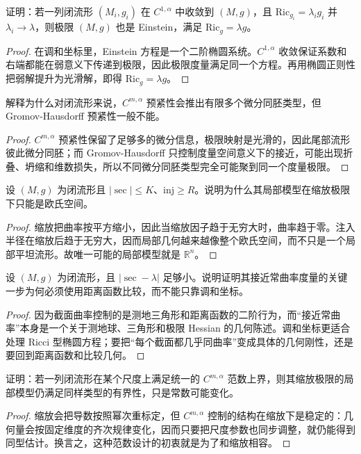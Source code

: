 \documentclass[11pt,a4paper,openany]{ctexbook}
\numberwithin{equation}{chapter}
\begin{document}
\begin{exercise}
证明：若一列闭流形 \((M_i,g_i)\) 在 \(C^{1,\alpha}\) 中收敛到 \((M,g)\)，且 \(\mathrm{Ric}_{g_i}=\lambda_i g_i\) 并 \(\lambda_i\to \lambda\)，则极限 \((M,g)\) 也是 Einstein，满足 \(\mathrm{Ric}_g=\lambda g\)。
\end{exercise}
\begin{proof}
在调和坐标里，Einstein 方程是一个二阶椭圆系统。\(C^{1,\alpha}\) 收敛保证系数和右端都能在弱意义下传递到极限，因此极限度量满足同一个方程。再用椭圆正则性把弱解提升为光滑解，即得 \(\mathrm{Ric}_g=\lambda g\)。  
\end{proof}

\begin{exercise}
解释为什么对闭流形来说，\(C^{m,\alpha}\) 预紧性会推出有限多个微分同胚类型，但 Gromov-Hausdorff 预紧性一般不能。
\end{exercise}
\begin{proof}
\(C^{m,\alpha}\) 预紧性保留了足够多的微分信息，极限映射是光滑的，因此尾部流形彼此微分同胚；而 Gromov-Hausdorff 只控制度量空间意义下的接近，可能出现折叠、坍缩和维数损失，所以不同微分同胚类型完全可能聚到同一个度量极限。  
\end{proof}

\begin{exercise}
设 \((M,g)\) 为闭流形且 \(|\sec|\le K\)、\(\mathrm{inj}\ge R\)。说明为什么其局部模型在缩放极限下只能是欧氏空间。
\end{exercise}
\begin{proof}
缩放把曲率按平方缩小，因此当缩放因子趋于无穷大时，曲率趋于零。注入半径在缩放后趋于无穷大，因而局部几何越来越像整个欧氏空间，而不只是一个局部平坦流形。故唯一可能的局部模型就是 \(\mathbb R^n\)。  
\end{proof}

\begin{exercise}
设 \((M,g)\) 为闭流形，且 \(|\sec-\lambda|\) 足够小。说明证明其接近常曲率度量的关键一步为何必须使用距离函数比较，而不能只靠调和坐标。
\end{exercise}
\begin{proof}
因为截面曲率控制的是测地三角形和距离函数的二阶行为，而“接近常曲率”本身是一个关于测地球、三角形和极限 Hessian 的几何陈述。调和坐标更适合处理 Ricci 型椭圆方程；要把“每个截面都几乎同曲率”变成具体的几何刚性，还是要回到距离函数和比较几何。  
\end{proof}

\begin{exercise}
证明：若一列闭流形在某个尺度上满足统一的 \(C^{m,\alpha}\) 范数上界，则其缩放极限的局部模型仍满足同样类型的有界性，只是常数可能变化。
\end{exercise}
\begin{proof}
缩放会把导数按照幂次重标定，但 \(C^{m,\alpha}\) 控制的结构在缩放下是稳定的：几何量会按固定维度的齐次规律变化，因而只要把尺度参数也同步调整，就仍能得到同型估计。换言之，这种范数设计的初衷就是为了和缩放相容。  
\end{proof}
\end{document}
